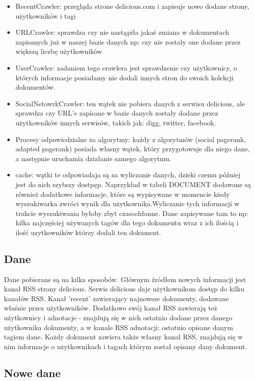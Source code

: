 \begin{itemize}
\item RecentCrawler: przegląda strone delicious.com i zapisuje nowo dodane strony, użytkowników i tagi
\item URLCrawler: sprawdza czy nie nastąpiła jakaś zmiana w dokumentach zapisanych już w naszej bazie danych np: czy nie zostały one dodane przez większą liczbę użytkowników
\item UserCrawler: zadaniem tego crawlera jest sprawdzenie czy użytkownicy, o których informacje posiadamy nie dodali innych stron do swoich kolekcji dokumentów.
\item SocialNetowrkCrawler: ten wątek nie pobiera danych z serwisu delicious, ale sprawdza czy URL'e zapisane w bazie danych zostały dodane przez użytkowników innych serwisów, takich jak: digg, twitter, facebook.
\item Procesy odpowiedzialne za algorytmy: każdy z algorytmów (social pagerank, adapted pagerank) posiada własny wątek, który przygotowuje dla niego dane, a następnie uruchamia działanie samego algorytmu.
\item cache: wątki te odpowiadaja są za wyliczanie danych, dzieki czemu później jest do nich szybszy dostpęp. Naprzykład w tabeli DOCUMENT dodawane są również dodatkowe informacje, które są wypisywane w momencie kiedy wyszukiwarka zwróci wynik dla użytkownika.Wyliczanie tych informacji w trakcie wyszukiwania byłoby zbyt czasochłonne. Dane zapisywane tam to np: kilka najczęściej używanych tagów dla tego dokumentu wraz z ich ilością i ilość uzytkowników którzy dodali ten dokument.
\end{itemize}

\subsection{Dane}

Dane pobierane są na kilka sposobów. Głównym źródłem nowych informacji jest kanał RSS strony delicious. Serwis delicious daje użytkownikom dostęp do kilku kanałów RSS. Kanał 'recent' zawierający najnowsze dokumenty, dodawane właśnie przez użytkowników. Dodatkowo swój kanał RSS zawierają też użytkownicy i adnotacje - znajdują się w nich ostatnio dodane przez danego użytkownika dokumenty, a w kanale RSS adnotacji: ostatnio opisane danym tagiem dane. Każdy dokument zawiera także własny kanał RSS, znajdują się w nim informacje o użytkownikach i tagach którym został opisany dany dokument.

\subsection*{Nowe dane}

